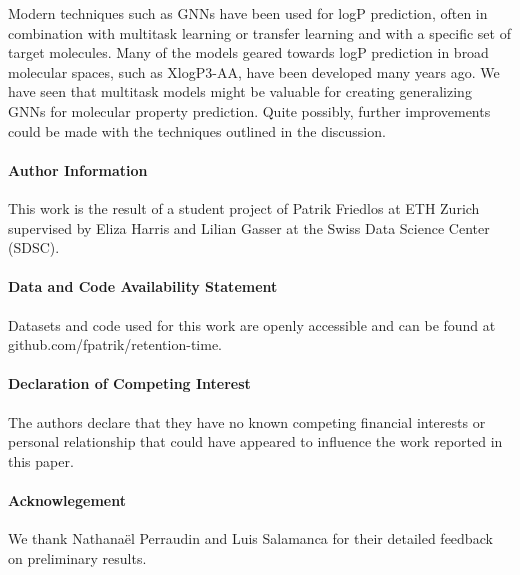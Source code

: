 \documentclass{article}
\begin{document}
Modern techniques such as GNNs have been used for logP prediction, often in combination with multitask learning or transfer learning and with a specific set of target molecules. Many of the models geared towards logP prediction in broad molecular spaces, such as XlogP3-AA, have been developed many years ago. We have seen that multitask models might be valuable for creating generalizing GNNs for molecular property prediction. Quite possibly, further improvements could be made with the techniques outlined in the discussion.

\newpage
\paragraph{Author Information\\}

This work is the result of a student project of Patrik Friedlos at ETH Zurich supervised by Eliza Harris and Lilian Gasser at the Swiss Data Science Center (SDSC).

\paragraph{Data and Code Availability Statement\\}

Datasets and code used for this work are openly accessible and can be found at github.com/fpatrik/retention-time.

\paragraph{Declaration of Competing Interest\\}

The authors declare that they have no known competing financial interests or personal relationship that could have appeared to influence the work reported in this paper.

\paragraph{Acknowlegement\\}

We thank Nathanaël Perraudin and Luis Salamanca for their detailed feedback on preliminary results.

\newpage
 

\end{document}
